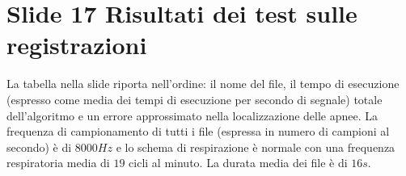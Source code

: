 \section{Slide 17 Risultati dei test sulle registrazioni}
    La tabella nella slide riporta nell'ordine: il nome del file, il tempo di esecuzione (espresso come media dei tempi di esecuzione per secondo di segnale) totale dell'algoritmo e un errore approssimato nella localizzazione delle apnee.
    La frequenza di campionamento di tutti i file (espressa in numero di campioni al secondo) \`e di $8000 Hz$ e lo schema di respirazione \`e normale con una frequenza respiratoria media di $19$ cicli al minuto.
    La durata media dei file \`e di $16s$.

